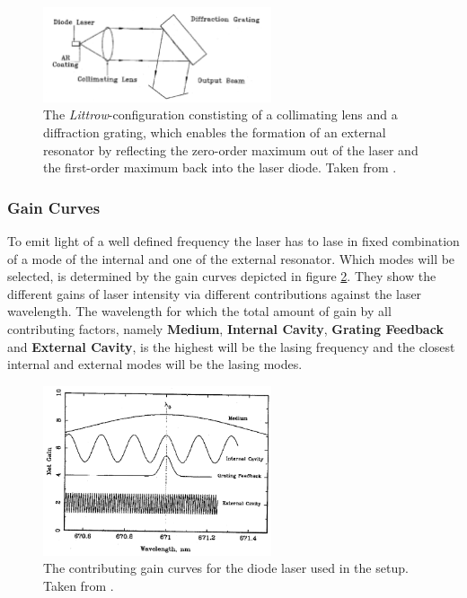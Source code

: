             \begin{figure}[h]
                \centering
                \includegraphics[width = 0.6\textwidth]{pictures/littrow.png}
                \caption{The \textit{Littrow}-configuration constisting of a collimating lens and a diffraction grating, which enables the formation of an external resonator by reflecting the zero-order maximum out of the laser and the first-order maximum back into the laser diode. Taken from \cite{tu_dortmund_versuchsanleitung_2022-1}.}
                \label{fig:littrow}
            \end{figure}
        
            \FloatBarrier


        \subsubsection{Gain Curves}
            To emit light of a well defined frequency the laser has to lase in fixed combination of a mode of the internal and one of the external resonator. Which modes will be selected, is determined by
            the gain curves depicted in figure \ref{fig:gain_curves}. They show the different gains of laser intensity via different contributions against the laser wavelength. The wavelength for which the
            total amount of gain by all contributing factors, namely \textbf{Medium}, \textbf{Internal Cavity}, \textbf{Grating Feedback} and \textbf{External Cavity}, is the highest will be the lasing 
            frequency and the closest internal and external modes will be the lasing modes.\newline

            \begin{figure}[h]
                \centering
                \includegraphics[width = 0.6\textwidth]{pictures/gain_curves.png}
                \caption{The contributing gain curves for the diode laser used in the setup. Taken from \cite{tu_dortmund_versuchsanleitung_2022-1}.}
                \label{fig:gain_curves}
            \end{figure}
        
